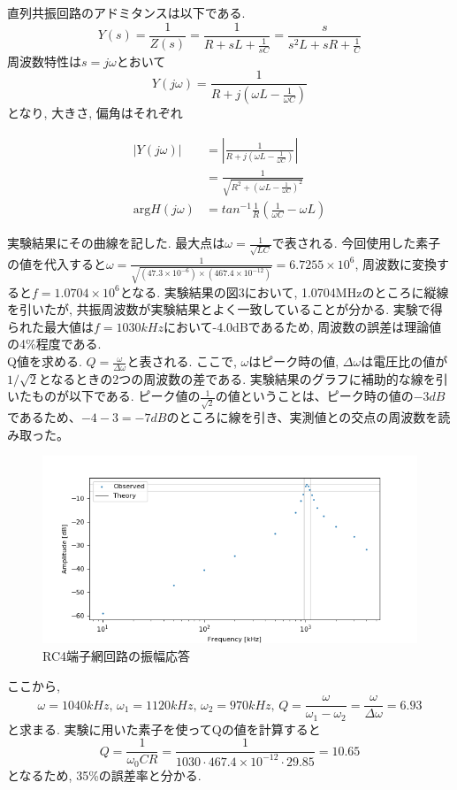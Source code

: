 \documentclass[a4j,dvipdfmx]{article}
\begin{document}
直列共振回路のアドミタンスは以下である. 
$$
Y(s) = \frac{1}{Z(s)} = \frac{1}{R+sL+\frac{1}{sC}} = \frac{s}{s^2L+sR+\frac{1}{C}}
$$
周波数特性は$s = j\omega$とおいて
$$
Y(j\omega) = \frac{1}{R+j\left(\omega L-\frac{1}{\omega C}\right)}
$$
となり, 大きさ, 偏角はそれぞれ

\begin{equation} \label{eq1}
\begin{split}
|Y(j\omega)| &= \left|\frac{1}{R+j(\omega L-\frac{1}{\omega C})}\right| \nonumber \\
&= \frac{1}{\sqrt{R^2+\left(\omega L-\frac{1}{\omega C}\right)^2}}\\
\mbox{arg} H(j\omega) &= tan^{-1}\frac{1}{R}\left(\frac{1}{\omega C}-\omega L\right)
\end{split}
\end{equation}

実験結果にその曲線を記した. 最大点は$\omega = \frac{1}{\sqrt{LC}}$で表される. 今回使用した素子の値を代入すると$\omega = \frac{1}{\sqrt{(47.3 \times 10^{-6})\times(467.4 \times 10^{-12})}} = 6.7255 \times 10^6$, 周波数に変換すると$f = 1.0704 \times 10^6$となる. 実験結果の図3において, 1.0704MHzのところに縦線を引いたが, 共振周波数が実験結果とよく一致していることが分かる. 実験で得られた最大値は$f=1030kHz$において-4.0dBであるため, 周波数の誤差は理論値の4\%程度である. 
\\Q値を求める. $Q = \frac{\omega}{\Delta\omega}$と表される. ここで, $\omega$はピーク時の値, $\Delta\omega$は電圧比の値が$1/\sqrt{2}$となるときの2つの周波数の差である. 実験結果のグラフに補助的な線を引いたものが以下である. ピーク値の$\frac{1}{\sqrt{2}}$の値ということは、ピーク時の値の$-3dB$であるため、$-4-3 = -7dB$のところに線を引き、実測値との交点の周波数を読み取った。

\begin{figure}[H]
    \begin{center}
     	\includegraphics[width=12cm]{figures/series_resonant_RLC_amp_measure.png}
        \caption{RC4端子網回路の振幅応答}
    \end{center}
\end{figure}
ここから, 
$$\omega = 1040kHz,\, \omega_1 = 1120kHz,\, \omega_2 = 970kHz,\, Q = \frac{\omega}{\omega_1-\omega_2} = \frac{\omega}{\Delta\omega} = 6.93$$
と求まる. 実験に用いた素子を使ってQの値を計算すると
$$
Q = \frac{1}{\omega_0 CR} = \frac{1}{1030 \cdot 467.4 \times 10^{-12} \cdot 29.85} = 10.65
$$
となるため, 35\%の誤差率と分かる. \\
\end{document}
